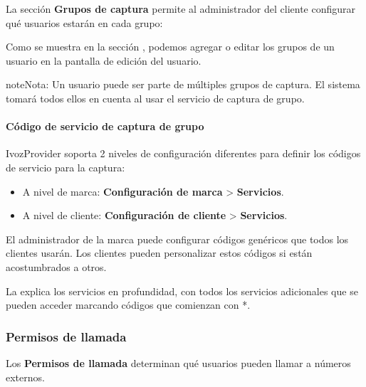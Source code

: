 \documentclass[letterpaper,10pt,spanish]{sphinxmanual}
\begin{document}
La sección \textbf{Grupos de captura} permite al administrador del cliente configurar qué usuarios estarán en cada grupo:

Como se muestra en la sección {\hyperref[administration_portal/client/vpbx/users:users]{}}, podemos agregar o editar los grupos de un usuario en la pantalla de edición del usuario.

\begin{notice}{note}{Nota:}
Un usuario puede ser parte de múltiples grupos de captura. El sistema tomará todos ellos en cuenta al usar el servicio de captura de grupo.
\end{notice}


\paragraph{Código de servicio de captura de grupo}
\label{administration_portal/client/vpbx/user_configuration/pick_up_groups:group-pickup-service-code}
IvozProvider soporta 2 niveles de configuración diferentes para definir los códigos de servicio para la captura:
\begin{itemize}
\item {} 
A nivel de marca: \textbf{Configuración de marca} \textgreater{} \textbf{Servicios}.

\item {} 
A nivel de cliente: \textbf{Configuración de cliente} \textgreater{} \textbf{Servicios}.

\end{itemize}

El administrador de la marca puede configurar códigos genéricos que todos los clientes usarán. Los clientes pueden personalizar estos códigos si están acostumbrados a otros.

La {\hyperref[administration_portal/client/vpbx/services:services]{}} explica los servicios en profundidad, con todos los servicios adicionales que se pueden acceder marcando códigos que comienzan con *.


\subsubsection{Permisos de llamada}
\label{administration_portal/client/vpbx/user_configuration/call_acls:call-permissions}\label{administration_portal/client/vpbx/user_configuration/call_acls::doc}\label{administration_portal/client/vpbx/user_configuration/call_acls:call-acls}
Los \textbf{Permisos de llamada} determinan qué usuarios pueden llamar a números externos.
\end{document}
